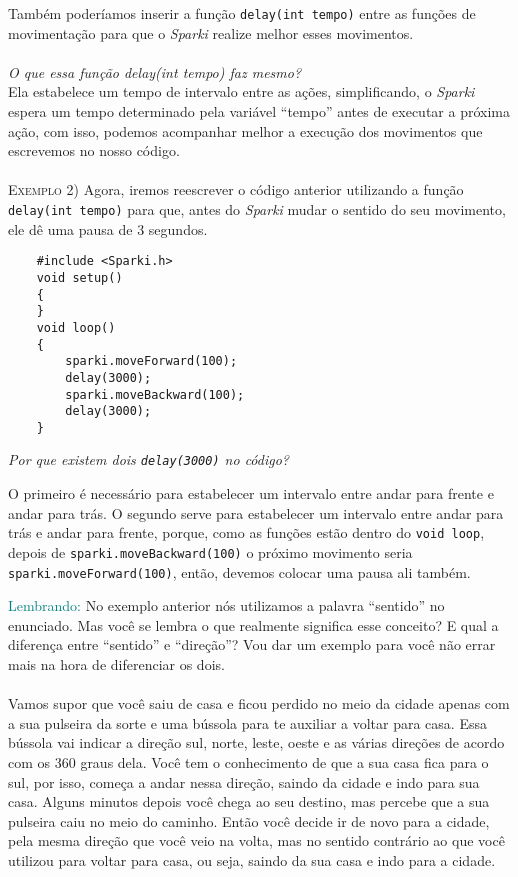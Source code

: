     Também poderíamos inserir a função \texttt{delay(int tempo)} entre as funções de movimentação para que o \textsl{Sparki} realize melhor esses movimentos.
    \\~\\
    \textit{O que essa função delay(int tempo) faz mesmo?} \\
    Ela estabelece um tempo de intervalo entre as ações, simplificando, o \textsl{Sparki} espera um tempo determinado pela variável ``tempo'' antes de executar a próxima ação, com isso, podemos acompanhar melhor a execução dos movimentos que escrevemos no nosso código.
    \\~\\
    \textsc{Exemplo 2)} Agora, iremos reescrever o código anterior utilizando a função \texttt{delay(int tempo)} para que, antes do \textsl{Sparki} mudar o sentido do seu movimento, ele dê uma pausa de 3 segundos.
    
    \begin{verbatim}
    #include <Sparki.h>
    void setup()
    {
    }
    void loop()
    {
        sparki.moveForward(100);
        delay(3000);
        sparki.moveBackward(100);
        delay(3000);
    }
    \end{verbatim}
    
    \textit{Por que existem dois \texttt{delay(3000)} no código?}
    
    O primeiro é necessário para estabelecer um intervalo entre andar para frente e andar para trás. O segundo serve para estabelecer um intervalo entre andar para trás e andar para frente, porque, como as funções estão dentro do \texttt{void loop}, depois de \texttt{sparki.moveBackward(100)} o próximo movimento seria \texttt{sparki.moveForward(100)}, então, devemos colocar uma pausa ali também.  
    
    \begin{center}
        \textcolor{teal}{Lembrando:} No exemplo anterior nós utilizamos a palavra ``sentido'' no enunciado. Mas você se lembra o que realmente significa esse conceito? E qual a diferença entre ``sentido'' e ``direção''? Vou dar um exemplo para você não errar mais na hora de diferenciar os dois.
    \end{center}
    
    \paragraph{}
    Vamos supor que você saiu de casa e ficou perdido no meio da cidade apenas com a sua pulseira da sorte e uma bússola para te auxiliar a voltar para casa. Essa bússola vai indicar a direção sul, norte, leste, oeste e as várias direções de acordo com os 360 graus dela. Você tem o conhecimento de que a sua casa fica para o sul, por isso, começa a andar nessa direção, saindo da cidade e indo para sua casa. Alguns minutos depois você chega ao seu destino, mas percebe que a sua pulseira caiu no meio do caminho. Então você decide ir de novo para a cidade, pela mesma direção que você veio na volta, mas no sentido contrário ao que você utilizou para voltar para casa, ou seja, saindo da sua casa e indo para a cidade. 
